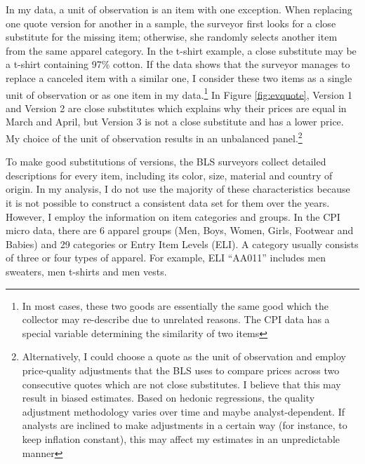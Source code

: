 \documentclass[12pt]{article}
\begin{document}
		
		
		In my data, a unit of observation is an item with one exception. When replacing one quote version for another in a sample, the surveyor first looks for a close substitute for the missing item; otherwise, she randomly selects another item from the same apparel category. In the t-shirt example, a close substitute may be a t-shirt containing 97\% cotton. If the data shows that the surveyor manages to replace a canceled item with a similar one, I consider these two items as a single unit of observation or as one item in my data.\footnote{In most cases, these two goods are essentially the same good which the collector may re-describe due to unrelated reasons. The CPI data has a special variable determining the similarity of two items} In Figure \ref{fig:evquote}, Version 1 and Version 2 are close substitutes which explains why their prices are equal in March and April, but Version 3 is not a close substitute and has a lower price. My choice of the unit of observation results in an unbalanced panel.\footnote{Alternatively, I could choose a quote as the unit of observation and employ price-quality adjustments that the BLS uses to compare prices across two consecutive quotes which are not close substitutes. I believe that this may result in biased estimates. Based on hedonic regressions, the quality adjustment methodology varies over time and maybe analyst-dependent. If analysts are inclined to make adjustments in a certain way (for instance, to keep inflation constant), this may affect my estimates in an unpredictable manner}
		
		To make good substitutions of versions, the BLS surveyors collect detailed descriptions for every item, including its color, size, material and country of origin. In my analysis, I do not use the majority of these characteristics because it is not possible to construct a consistent data set for them over the years. However, I employ the information on item categories and groups. In the CPI micro data, there are 6 apparel groups (Men, Boys, Women, Girls, Footwear and Babies) and 29 categories or Entry Item Levels (ELI). A category usually consists of three or four types of apparel. For example, ELI \enquote{AA011} includes men sweaters, men t-shirts and men vests.
		
\end{document}

